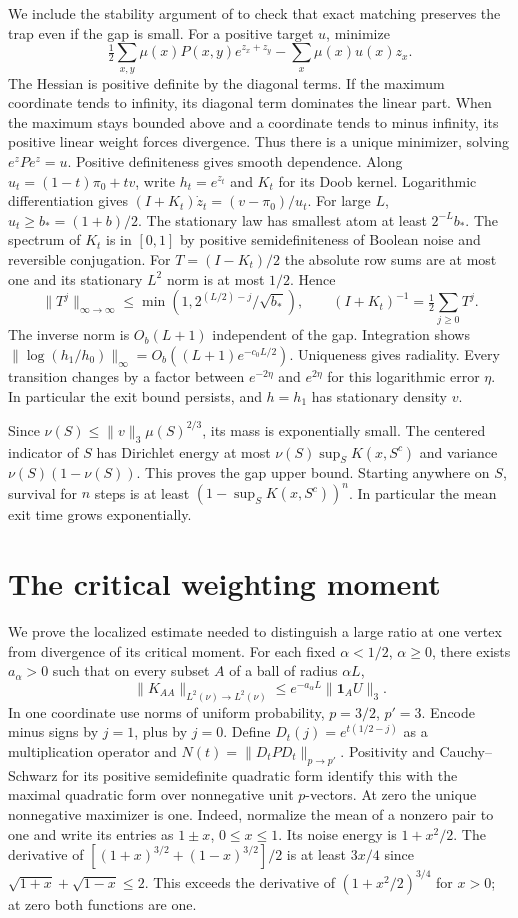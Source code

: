 \documentclass[11pt]{article}
\newcommand{\one}{\mathbf 1}
\begin{document}
We include the stability argument of \cite[Lemma 10.4]{mom} to check that exact matching preserves the trap even if the gap is small. For a positive target $u$, minimize
\[
 \tfrac12\sum_{x,y}\mu(x)P(x,y)e^{z_x+z_y}-\sum_x\mu(x)u(x)z_x .
\]
The Hessian is positive definite by the diagonal terms. If the maximum coordinate tends to infinity, its diagonal term dominates the linear part. When the maximum stays bounded above and a coordinate tends to minus infinity, its positive linear weight forces divergence. Thus there is a unique minimizer, solving $e^z P e^z=u$. Positive definiteness gives smooth dependence. Along $u_t=(1-t)\pi_0+t v$, write $h_t=e^{z_t}$ and $K_t$ for its Doob kernel. Logarithmic differentiation gives $(I+K_t)\dot z_t=(v-\pi_0)/u_t$. For large $L$, $u_t\ge b_*=(1+b)/2$. The stationary law has smallest atom at least $2^{-L} b_*$. The spectrum of $K_t$ is in $[0,1]$ by positive semidefiniteness of Boolean noise and reversible conjugation. For $T=(I-K_t)/2$ the absolute row sums are at most one and its stationary $L^2$ norm is at most $1/2$. Hence
\[
 \|T^j\|_{\infty\to\infty}\le\min(1,2^{(L/2)-j}/\sqrt{b_*}),
 \qquad (I+K_t)^{-1}=\tfrac12\sum_{j\ge0}T^j .
\]
The inverse norm is $O_b(L+1)$ independent of the gap. Integration shows $\|\log(h_1/h_0)\|_\infty=O_b((L+1)e^{-c_0 L/2})$. Uniqueness gives radiality. Every transition changes by a factor between $e^{-2\eta}$ and $e^{2\eta}$ for this logarithmic error $\eta$. In particular the exit bound persists, and $h=h_1$ has stationary density $v$.

Since $\nu(S)\le\|v\|_3\mu(S)^{2/3}$, its mass is exponentially small. The centered indicator of $S$ has Dirichlet energy at most $\nu(S)\sup_{S}K(x,S^c)$ and variance $\nu(S)(1-\nu(S))$. This proves the gap upper bound. Starting anywhere on $S$, survival for $n$ steps is at least $(1-\sup_S K(x,S^c))^n$. In particular the mean exit time grows exponentially.

\section{The critical weighting moment}\label{tilt}
We prove the localized estimate needed to distinguish a large ratio at one vertex from divergence of its critical moment. For each fixed $\alpha<1/2$, $\alpha\ge0$, there exists $a_\alpha>0$ such that on every subset $A$ of a ball of radius $\alpha L$,
\[
 \|K_{AA}\|_{L^2(\nu)\to L^2(\nu)}
 \le e^{-a_\alpha L}\|\one_A U\|_3.                                      \tag{1}
\]
In one coordinate use norms of uniform probability, $p=3/2$, $p'=3$. Encode minus signs by $j=1$, plus by $j=0$. Define $D_t(j)=e^{t(1/2-j)}$ as a multiplication operator and $N(t)=\|D_t P D_t\|_{p\to p'}$. Positivity and Cauchy--Schwarz for its positive semidefinite quadratic form identify this with the maximal quadratic form over nonnegative unit $p$-vectors. At zero the unique nonnegative maximizer is one. Indeed, normalize the mean of a nonzero pair to one and write its entries as $1\pm x$, $0\le x\le1$. Its noise energy is $1+x^2/2$. The derivative of $[(1+x)^{3/2}+(1-x)^{3/2}]/2$ is at least $3x/4$ since $\sqrt{1+x}+\sqrt{1-x}\le2$. This exceeds the derivative of $(1+x^2/2)^{3/4}$ for $x>0$; at zero both functions are one.
\end{document}

